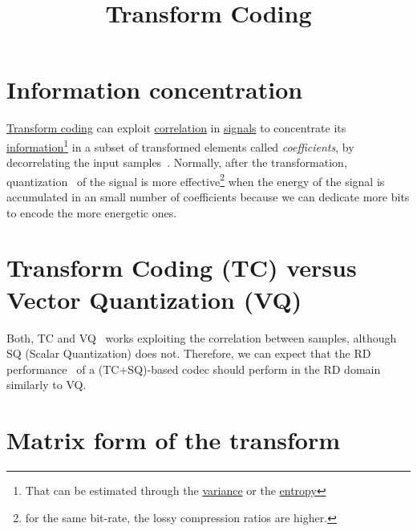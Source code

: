\title{Transform Coding}

\maketitle
\tableofcontents

\section{Information concentration}

\href{https://web.stanford.edu/class/ee398a/handouts/lectures/07-TransformCoding.pdf}{Transform
  coding} can exploit
\href{https://en.wikipedia.org/wiki/Correlation_and_dependence}{correlation}
in \href{https://en.wikipedia.org/wiki/Signal}{signals} to concentrate
its
\href{https://en.wikipedia.org/wiki/Information}{information}\footnote{That
can be estimated through the
\href{https://en.wikipedia.org/wiki/Variance}{variance} or the
\href{https://en.wikipedia.org/wiki/Entropy}{entropy}} in a subset of
transformed elements called \emph{coefficients}, by decorrelating the
input samples~\cite{sayood2017introduction}. Normally, after the
transformation, quantization~\cite{vruiz__scalar_quantization} of the
signal is more effective\footnote{for the same bit-rate, the lossy
compression ratios are higher.} when the energy of the signal is
accumulated in an small number of coefficients because we can dedicate
more bits to encode the more energetic ones.


\section{Transform Coding (TC) versus Vector Quantization (VQ)}

Both, TC and VQ~\cite{vruiz__vector_quantization} works exploiting the
correlation between samples, although SQ (Scalar Quantization) does
not. Therefore, we can expect that the RD
performance~\cite{vruiz__information_theory} of a (TC+SQ)-based codec
should perform in the RD domain similarly to VQ.


\section{Matrix form of the transform}

